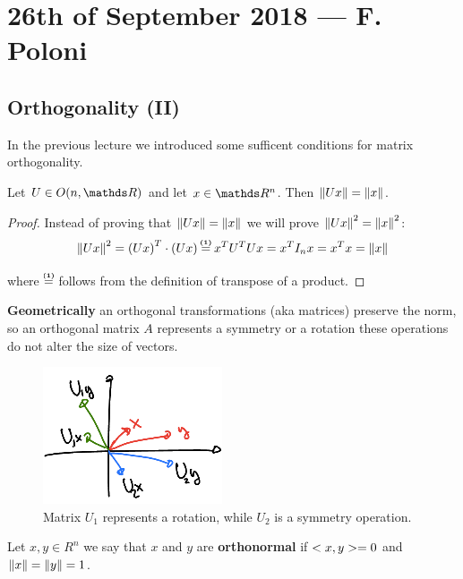 \documentclass[computationalMathematics.tex]{subfiles}
\begin{document}
\section{26th of September 2018 --- F. Poloni}

\subsection{Orthogonality (II)}
In the previous lecture we introduced some sufficent conditions for matrix orthogonality.

\begin{theorem}
  Let $U \in O(n, \R)$ and let $x \in \R^n$. Then $\left\lVert Ux\right\rVert = \left\lVert x\right\rVert$.
\end{theorem}

\begin{proof}
  Instead of proving that $\left\lVert Ux\right\rVert = \left\lVert x\right\rVert$ we will prove $\left\lVert Ux\right\rVert^2 = \left\lVert x\right\rVert^2$:\\
  
  \[
    \norm{Ux}^2 = \tr{(Ux)} \cdot (Ux) \numeq{(1)} \tr{x} \tr{U} U x = \tr{x} I_n x = \tr{x} x = \norm{x}
  \]

  where $\numeq{(1)}$ follows from the definition of transpose of a product.
\end{proof}

\textbf{Geometrically} an orthogonal transformations (aka matrices) preserve the norm, so an orthogonal matrix $A$ represents a symmetry or a rotation these operations do not alter the size of vectors.

\begin{figure}[H]
    \centering
    \includegraphics[scale = 2]{pics/26sett/orthgonal.png}
    \caption{Matrix $U_1$ represents a rotation, while $U_2$ is a symmetry operation.}\label{fig:26sett_ortho}
\end{figure}

\begin{definition}[Orthonormality]
  Let $x, y \in R^n$ we say that $x$ and $y$ are \textbf{orthonormal} if $<x, y> = 0$ and $\left\lVert x\right\rVert = \left\lVert y\right\rVert = 1$.
\end{definition}
\end{document}
